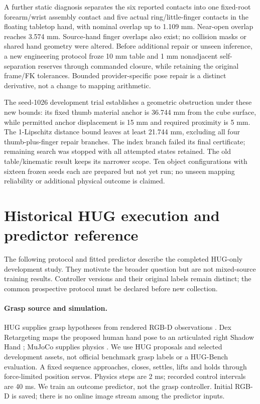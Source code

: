 \documentclass[10pt,letterpaper]{article}
\begin{document}
A further static diagnosis separates the six reported contacts into one
fixed-root forearm/wrist assembly contact and five actual ring/little-finger
contacts in the floating tabletop hand, with nominal overlap up to 1.109 mm.
Near-open overlap reaches 3.574 mm. Source-hand finger overlaps also exist;
no collision masks or shared hand geometry were altered. Before additional
repair or unseen inference, a new engineering protocol froze 10 mm table
and 1 mm nonadjacent self-separation reserves through commanded closure,
while retaining the original frame/FK tolerances. Bounded provider-specific
pose repair is a distinct derivative, not a change to mapping arithmetic.

The seed-1026 development trial establishes a geometric obstruction under
these new bounds: its fixed thumb material anchor is 36.744 mm from the cube
surface, while permitted anchor displacement is 15 mm and required proximity
is 5 mm. The 1-Lipschitz distance bound leaves at least 21.744 mm, excluding
all four thumb-plus-finger repair branches. The index branch failed its final
certificate; remaining search was stopped with all attempted states retained.
The old table/kinematic result keeps its narrower scope. Ten object
configurations with sixteen frozen seeds each are prepared but not yet run;
no unseen mapping reliability or additional physical outcome is claimed.

\section{Historical HUG execution and predictor reference}
The following protocol and fitted predictor describe the completed HUG-only
development study. They motivate the broader question but are not mixed-source
training results. Controller versions and their original labels remain distinct;
the common prospective protocol must be declared before new collection.
\paragraph{Grasp source and simulation.}
HUG supplies grasp hypotheses from rendered RGB-D observations \cite{hug}.
Dex Retargeting maps the proposed human hand pose to an articulated right
Shadow Hand \cite{dex}; MuJoCo supplies physics \cite{mujoco}. We use HUG
proposals and selected development assets, not official benchmark grasp labels
or a HUG-Bench evaluation. A fixed sequence approaches, closes, settles, lifts
and holds through force-limited position servos. Physics steps are 2 ms;
recorded control intervals are 40 ms. We train an outcome predictor, not the
grasp controller. Initial RGB-D is saved; there is no online image stream among
the predictor inputs.
\end{document}
